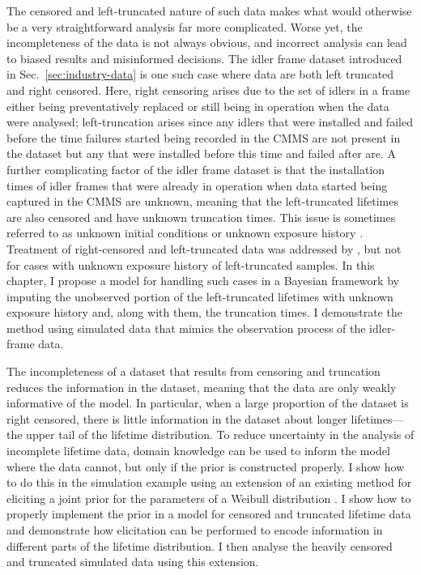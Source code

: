 The censored and left-truncated nature of such data makes what would otherwise be a very straightforward analysis far more complicated. Worse yet, the incompleteness of the data is not always obvious, and incorrect analysis can lead to biased results and misinformed decisions. The idler frame dataset introduced in Sec.~\ref{sec:industry-data} is one such case where data are both left truncated and right censored. Here, right censoring arises due to the set of idlers in a frame either being preventatively replaced or still being in operation when the data were analysed; left-truncation arises since any idlers that were installed and failed before the time failures started being recorded in the CMMS are not present in the dataset but any that were installed before this time and failed after are. A further complicating factor of the idler frame dataset is that the installation times of idler frames that were already in operation when data started being captured in the CMMS are unknown, meaning that the left-truncated lifetimes are also censored and have unknown truncation times. This issue is sometimes referred to as unknown initial conditions or unknown exposure history \citep{guo1993}. Treatment of right-censored and left-truncated data was addressed by \citet{hong2009}, but not for cases with unknown exposure history of left-truncated samples. In this chapter, I propose a model for handling such cases in a Bayesian framework by imputing the unobserved portion of the left-truncated lifetimes with unknown exposure history and, along with them, the truncation times. I demonstrate the method using simulated data that mimics the observation process of the idler-frame data.

The incompleteness of a dataset that results from censoring and truncation reduces the information in the dataset, meaning that the data are only weakly informative of the model. In particular, when a large proportion of the dataset is right censored, there is little information in the dataset about longer lifetimes---the upper tail of the lifetime distribution. To reduce uncertainty in the analysis of incomplete lifetime data, domain knowledge can be used to inform the model where the data cannot, but only if the prior is constructed properly. I show how to do this in the simulation example using an extension of an existing method for eliciting a joint prior for the parameters of a Weibull distribution \citep{kaminskiy2005}. I show how to properly implement the prior in a model for censored and truncated lifetime data and demonstrate how elicitation can be performed to encode information in different parts of the lifetime distribution. I then analyse the heavily censored and truncated simulated data using this extension.

